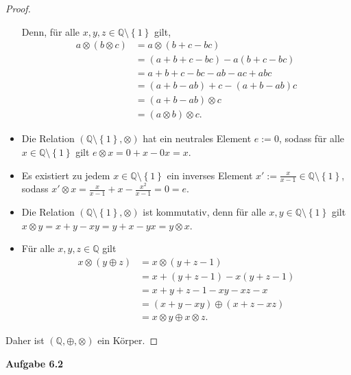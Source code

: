 \documentclass[12pt]{extarticle}
\newcommand{\mg}[1]{\mathbb{#1}}
\begin{document}
\begin{proof}
\begin{itemize}
  Denn, für alle \(x, y, z \in \mg{Q}\setminus \left\{ 1 \right\}\)
  gilt,
\begin{align*}
  a \otimes (b \otimes c) &= a \otimes (b+c - bc)\\
                          &= (a+b+c - bc) - a(b+c-bc)\\
                          &= a+b+c-bc-ab-ac+abc \\
                          &= (a+b-ab)+c - (a+b-ab)c\\
                          &= (a+b - ab) \otimes c\\
  &= (a \otimes b) \otimes c.
\end{align*}
\item Die Relation
  \((\mg{Q} \setminus \left\{ 1 \right\}, \otimes)\) hat ein
  neutrales Element \(e:=0\), sodass für alle
  \(x \in \mg{Q} \setminus \left\{ 1 \right\}\) gilt
  \(e \otimes x = 0+ x - 0x =x\).
\item Es existiert zu jedem
  \(x \in \mg{Q} \setminus \left\{ 1 \right\}\) ein inverses Element
  \(x':=\frac{x}{x-1} \in \mg{Q} \setminus \left\{ 1 \right\}\),
  sodass \(x' \otimes x= \frac{x}{x-1} + x - \frac{x^2}{x-1} = 0 =e\).
\item Die Relation
  \((\mg{Q} \setminus \left\{ 1 \right\}, \otimes)\) ist kommutativ,
  denn für alle \(x, y \in \mg{Q} \setminus \left\{ 1 \right\}\)
  gilt \(x \otimes y = x + y - xy = y+x - yx = y \otimes x\).
\item Für alle \(x, y, z \in \mg{Q}\) gilt
\begin{align*}
  x \otimes (y \oplus z) &= x \otimes (y + z - 1)\\
                         &= x + (y + z - 1) - x(y+z-1)\\
                         &= x+y+z-1-xy-xz-x\\
                         &= (x + y - xy) \oplus (x + z - xz)\\
  &= x \otimes y \oplus x \otimes z.
\end{align*}
\end{itemize}

Daher ist \((\mg{Q}, \oplus, \otimes)\) ein Körper.
\end{proof}

\textbf{Aufgabe 6.2}
\end{document}
